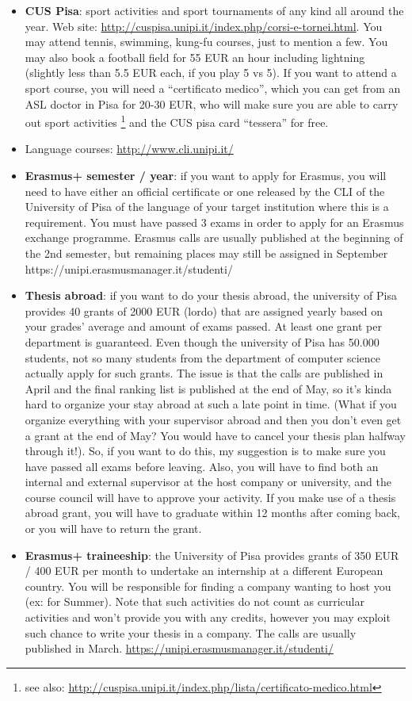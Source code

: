 \documentclass[11pt,fleqn,oneside]{book} %
\begin{document}
\begin{itemize}
\item \textbf{CUS Pisa}: sport activities and sport tournaments of any kind all around the year. Web site: \url{http://cuspisa.unipi.it/index.php/corsi-e-tornei.html}. You may attend tennis, swimming, kung-fu courses, just to mention a few. You may also book a football field for 55 EUR an hour including lightning (slightly less than 5.5 EUR each, if you play 5 vs 5).
If you want to attend a sport course, you will need a “certificato medico”, which you can get from an ASL doctor in Pisa for 20-30 EUR, who will make sure you are able to carry out sport activities \footnote{see also: \url{http://cuspisa.unipi.it/index.php/lista/certificato-medico.html}} and the CUS pisa card “tessera” for free. 
\item Language courses:  \url{http://www.cli.unipi.it/}
\item \textbf{Erasmus+ semester / year}: if you want to apply for Erasmus, you will need to have either an official certificate or one released by the CLI of the University of Pisa of the language of your target institution where this is a requirement. You must have passed 3 exams in order to apply for an Erasmus exchange programme. Erasmus calls are usually published at the beginning of the 2nd semester, but remaining places may still be assigned in September https://unipi.erasmusmanager.it/studenti/
\item \textbf{Thesis abroad}: if you want to do your thesis abroad, the university of Pisa provides 40 grants of 2000 EUR (lordo) that are assigned yearly based on your grades’ average and amount of exams passed. At least one grant per department is guaranteed. Even though the university of Pisa has 50.000 students, not so many students from the department of computer science actually apply for such grants. The issue is that the calls are published in April and the final ranking list is published at the end of May, so it’s kinda hard to organize your stay abroad at such a late point in time. (What if you organize everything with your supervisor abroad and then you don’t even get a grant at the end of May? You would have to cancel your thesis plan halfway through it!). So, if you want to do this, my suggestion is to make sure you have passed all exams before leaving.  Also, you will have to find both an internal and external supervisor at the host company or university, and the course council will have to approve your activity. If you make use of a thesis abroad grant, you will have to graduate within 12 months after coming back, or you will have to return the grant. 
\item \textbf{Erasmus+ traineeship}: the University of Pisa provides grants of 350 EUR / 400 EUR per month to undertake an internship at a different European country. You will be responsible for finding a company wanting to host you (ex: for Summer). Note that such activities do not count as curricular activities and won’t provide you with any credits, however you may exploit such chance to write your thesis in a company. The calls are usually published in March. 
\url{https://unipi.erasmusmanager.it/studenti/}
\end{itemize}
\end{document}

